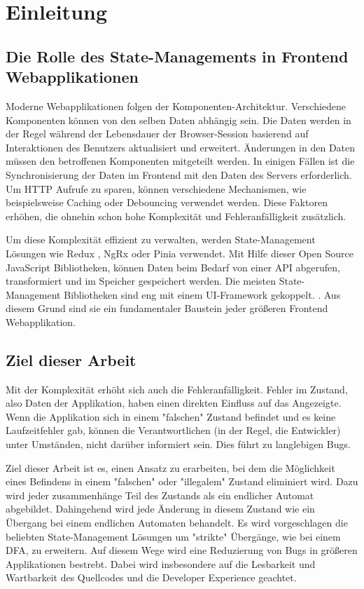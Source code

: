 \chapter{Einleitung}

\section{Die Rolle des State-Managements in Frontend Webapplikationen}

Moderne Webapplikationen folgen der Komponenten-Architektur. Verschiedene Komponenten können von den selben Daten abhängig sein. Die Daten werden in der Regel während der Lebensdauer der Browser-Session basierend auf Interaktionen des Benutzers aktualisiert und erweitert. Änderungen in den Daten müssen den betroffenen Komponenten mitgeteilt werden. In einigen Fällen ist die Synchronisierung der Daten im Frontend mit den Daten des Servers erforderlich. Um HTTP Aufrufe zu sparen, können verschiedene Mechanismen, wie beispielsweise Caching oder Debouncing verwendet werden. Diese Faktoren erhöhen, die ohnehin schon hohe Komplexität und Fehleranfälligkeit zusätzlich.

Um diese Komplexität effizient zu verwalten, werden State-Management Lösungen wie Redux \cite{redux}, NgRx \cite{ngrx} oder Pinia \cite{pinia} verwendet. Mit Hilfe dieser Open Source JavaScript Bibliotheken, können Daten beim Bedarf von einer API abgerufen, transformiert und im Speicher gespeichert werden. Die meisten State-Management Bibliotheken sind eng mit einem UI-Framework gekoppelt. \cite{ui-frameworks-and-state-management}. Aus diesem Grund sind sie ein fundamentaler Baustein jeder größeren Frontend Webapplikation.

\section{Ziel dieser Arbeit}

Mit der Komplexität erhöht sich auch die Fehleranfälligkeit. Fehler im Zustand, also Daten der Applikation, haben einen direkten Einfluss auf das Angezeigte. Wenn die Applikation sich in einem "falschen" Zustand befindet und es keine Laufzeitfehler gab, können die Verantwortlichen (in der Regel, die Entwickler) unter Umständen, nicht darüber informiert sein. Dies führt zu langlebigen Bugs.

Ziel dieser Arbeit ist es, einen Ansatz zu erarbeiten, bei dem die Möglichkeit eines Befindens in einem "falschen" oder "illegalem" Zustand eliminiert wird. Dazu wird jeder zusammenhänge Teil des Zustands als ein endlicher Automat \cite{fa} abgebildet. Dahingehend wird jede Änderung in diesem Zustand wie ein Übergang bei einem endlichen Automaten behandelt. Es wird vorgeschlagen die beliebten State-Management Lösungen um "strikte" Übergänge, wie bei einem DFA, zu erweitern. Auf diesem Wege wird eine Reduzierung von Bugs in größeren Applikationen bestrebt. Dabei wird insbesondere auf die Lesbarkeit und Wartbarkeit des Quellcodes und die Developer Experience geachtet.